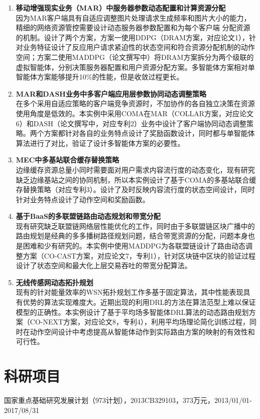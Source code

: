 \documentclass{resume}
\begin{document}
\begin{enumerate}
  \item \textbf{移动增强现实业务（MAR）中服务器参数动态配置和计算资源分配}
  \\ 因为MAR客户端具有自适应调整图片处理请求生成频率和图片大小的能力，精细的网络资源管控需要设计动态服务器参数配置和为每个客户端 分配资源的机制。设计了两个方案，方案一使用DDPG（DRAM方案，对应论文1），针对业务特征设计了反应用户请求紧迫性的状态空间和符合资源分配机制的动作空间；方案二使用MADDPG（论文撰写中）将DRAM方案拆分为两个级联的虚拟智能体，分别决策服务器配置和用户资源分配方案。多智能体方案相对单智能体方案能够提升10\%的性能，但是收敛过程更长。
  \item \textbf{MAR和DASH业务中多客户端应用层参数协同动态调整策略} 
  \\ 在多个采用自适应策略的客户端竞争资源时，不加协作的各自独立决策在资源使用角度是低效的。本实例中采用COMA在MAR（COLLAR方案，对应论文6）和DASH（论文撰写中，对应专利2）业务中设计了客户端协同动态调整策略。两个方案都针对各自的业务特点设计了奖励函数设计，同时都与单智能体算法进行了对比，验证了设计多智能体方案的必要性。
  \item \textbf{MEC中多基站联合缓存替换策略} 
  \\ 边缘缓存资源总量小同时需要面对用户需求内容流行度的动态变化，现有研究缺乏边缘基站之间的协同机制，所以本实例设计了基于COMA的多基站联合缓存替换策略（对应专利3）。设计了及时反映内容流行度的状态空间设计，同时针对业务特点设计了动作空间和奖励函数。
  \item  \textbf{基于BaaS的多联盟链路由动态规划和带宽分配}
  \\ 现有研究缺乏联盟链网络层性能优化的工作，同时由于多联盟链区块广播中的路由规划是经典的多多播树路径规划问题，结合带宽资源的分配，问题本身也是困难和少有研究的。本实例中使用MADDPG为各联盟链设计了路由动态调整方案（CO-CAST方案，对应论文7，专利1），针对区块链中区块的验证过程设计了状态空间和最大化上层交易吞吐的带宽分配算法。
  \item \textbf{无线传感网动态拓扑规划}
  \\ 现有的针对能量效率的WSN拓扑规划工作多基于固定算法，其中性能表现具有优势的算法实现难度大。近期出现的利用DRL的方法在算法范型上难以保证模型的正确性。本实例设计了基于平均场多智能体DRL算法的动态路由规划方案（CO-NEXT方案，对应论文8，专利4），利用平均场理论简化训练过程，同时在动作空间设计中考虑提高从智能体动作到实际路由方案的映射的有效性和可行性。
\end{enumerate}

\section{科研项目}
国家重点基础研究发展计划（973计划），2013CB329103，373万元，2013/01/01-2017/08/31
\end{document}
